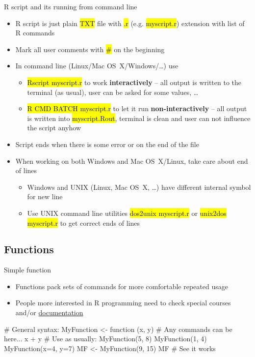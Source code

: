 \documentclass[compress, ucs, xelatex, 11pt, xcolor=svgnames,
  hyperref={
    bookmarks=true,
    unicode=true,
    colorlinks=true,
    pdftitle={Molecular data in R},
    plainpages=false,
    pdfauthor={Vojtech Zeisek},
    pdfsubject={Course about phylogeny and evolution in R},
    pdfcreator={XeLaTeX},
    pdfkeywords={R, evolution, phylogeny, molecular data},
    linkcolor=Tomato,
    anchorcolor=SaddleBrown,
    citecolor=Goldenrod,
    filecolor=DarkMagenta,
    menucolor=Sienna,
    urlcolor=DarkTurquoise,
    pdftex},
  url={hyphens, lowtilde} %
  ]{beamer}
\renewcommand{\texttt}[1]{\hl{\ttfamily #1}}
\begin{document}
\begin{frame}{R script and its running from command line}
  \begin{itemize}
    \item R script is just plain \texttt{TXT} file with \texttt{.r} (e.g. \texttt{myscript.r}) extension with list of R commands
    \item Mark all user comments with \texttt{\#} on the beginning
    \item In command line (Linux/Mac OS~X/Windows/\ldots) use
    \begin{itemize}
      \item \texttt{Rscript myscript.r} to work \textbf{interactively} -- all output is written to the terminal (as usual), user can be asked for some values, \ldots
      \item \texttt{R CMD BATCH myscript.r} to let it run \textbf{non-interactively} -- all output is written into \texttt{myscript.Rout}, terminal is clean and user can not influence the script anyhow
    \end{itemize}
    \item Script ends when there is some error or on the end of the file
    \item When working on both Windows and Mac OS~X/Linux, take care about end of lines
    \begin{itemize}
      \item Windows and UNIX (Linux, Mac OS~X, \ldots) have different internal symbol for new line
      \item Use UNIX command line utilities \texttt{dos2unix myscript.r} or \texttt{unix2dos myscript.r} to get correct ends of lines
    \end{itemize}
  \end{itemize}
\end{frame}

\subsection{Functions}

\begin{frame}[fragile]{Simple function}
  \begin{itemize}
    \item Functions pack sets of commands for more comfortable repeated usage
    \item People more interested in R programming need to check special courses and/or \href{https://cran.r-project.org/manuals.html}{documentation}
  \end{itemize}
  \begin{spluscode}
    # General syntax:
    MyFunction <- function (x, y) {
      # Any commands can be here...
      x + y
      }
    # Use as usually:
    MyFunction(5, 8)
    MyFunction(1, 4)
    MyFunction(x=4, y=7)
    MF <- MyFunction(9, 15)
    MF # See it works
  \end{spluscode}
\end{frame}
\end{document}
